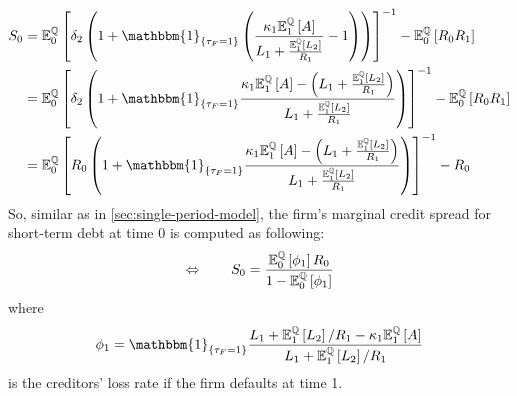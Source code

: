 \documentclass[main.tex]{subfiles}
\begin{document}
        \begin{align}
            S_0 &=
            \mathbb{E}_{0}^{\rnmeasure}\left[
                \delta_2\left(
                    1
                    + \mathbbm{1}_{\{\tau_{F} = 1\}}\left(
                        \frac{\kappa_1 \mathbb{E}_{1}^{\rnmeasure}\left[A\right]}{L_1 + \frac{\mathbb{E}_{1}^{\rnmeasure}\left[L_2\right]}{R_1}} - 1
                    \right)
                \right)
            \right]^{-1} - \mathbb{E}_{0}^{\rnmeasure}\left[R_0 R_1\right]
            \nonumber
            \\
            &=
            \mathbb{E}_{0}^{\rnmeasure}\left[
                \delta_2 \left(
                    1
                    + \mathbbm{1}_{\{\tau_{F} = 1\}}
                    \frac{
                        \kappa_1 \mathbb{E}_{1}^{\rnmeasure}\left[A\right] - \left(L_1 + \frac{\mathbb{E}_{1}^{\rnmeasure}\left[L_2\right]}{R_1}\right)
                    }{
                        L_1 + \frac{\mathbb{E}_{1}^{\rnmeasure}\left[L_2\right]}{R_1}
                    }
                \right)
            \right]^{-1} - \mathbb{E}_{0}^{\rnmeasure}\left[R_0 R_1\right]
            \nonumber
            \\
            &=
            \mathbb{E}_{0}^{\rnmeasure}\left[
                R_0 \left(
                    1
                    + \mathbbm{1}_{\{\tau_{F} = 1\}}
                    \frac{
                        \kappa_1 \mathbb{E}_{1}^{\rnmeasure}\left[A\right] - \left(L_1 + \frac{\mathbb{E}_{1}^{\rnmeasure}\left[L_2\right]}{R_1}\right)
                    }{
                        L_1 + \frac{\mathbb{E}_{1}^{\rnmeasure}\left[L_2\right]}{R_1}
                    }
                \right)
            \right]^{-1} - R_0
            \nonumber
        \end{align}
        So, similar as in \cref{sec:single-period-model}, the firm's marginal credit spread for short-term debt at time 0 is computed as following:
        \begin{equation}
            \Leftrightarrow \qquad
            S_0 =
            \frac{
                \mathbb{E}_{0}^{\mathbb{Q}}\left[\phi_1\right]R_0
            }{
                1 - \mathbb{E}_{0}^{\mathbb{Q}}\left[\phi_1\right] 
            }
        \end{equation}
        where
        \begin{equation}
            \phi_1 =
            \mathbbm{1}_{\{\tau_{F}=1\}}
            \frac{
                L_{1}+\mathbb{E}_{1}^{\rnmeasure}\left[L_{2}\right]/R_1 - \kappa_{1}\mathbb{E}_{1}^{\rnmeasure}\left[A\right]
            }{
                L_{1} + \mathbb{E}_{1}^{\rnmeasure}\left[L_{2}\right]/R_1
            }
        \end{equation}
        is the creditors' loss rate if the firm defaults at time 1.
        
\end{document}
